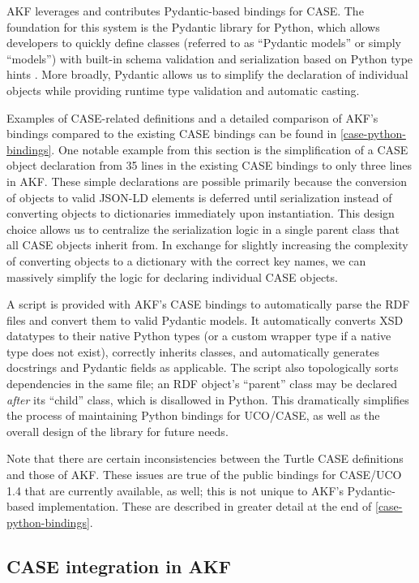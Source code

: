 AKF leverages and contributes Pydantic-based bindings for CASE. The
foundation for this system is the Pydantic library for Python, which
allows developers to quickly define classes (referred to as ``Pydantic
models'' or simply ``models'') with built-in schema validation and
serialization based on Python type hints \cite{colvinPydantic2024}.
More broadly, Pydantic allows us to simplify the declaration of
individual objects while providing runtime type validation and automatic
casting.

Examples of CASE-related definitions and a detailed comparison of AKF's
bindings compared to the existing CASE bindings can be found in
\autoref{case-python-bindings}. One notable example
from this section is the simplification of a CASE object declaration
from 35 lines in the existing CASE bindings to only three lines in AKF.
These simple declarations are possible primarily because the conversion
of objects to valid JSON-LD elements is deferred until serialization
instead of converting objects to dictionaries immediately upon
instantiation. This design choice allows us to centralize the
serialization logic in a single parent class that all CASE objects
inherit from. In exchange for slightly increasing the complexity of
converting objects to a dictionary with the correct key names, we can
massively simplify the logic for declaring individual CASE objects.

A script is provided with AKF's CASE bindings to automatically parse the
RDF files and convert them to valid Pydantic models. It automatically
converts XSD datatypes to their native Python types (or a custom wrapper
type if a native type does not exist), correctly inherits classes, and
automatically generates docstrings and Pydantic fields as applicable.
The script also topologically sorts dependencies in the same file; an
RDF object's ``parent'' class may be declared \emph{after} its ``child''
class, which is disallowed in Python. This dramatically simplifies the
process of maintaining Python bindings for UCO/CASE, as well as the
overall design of the library for future needs.

Note that there are certain inconsistencies between the Turtle CASE
definitions and those of AKF. These issues are true of the public
bindings for CASE/UCO 1.4 that are currently available, as well; this is
not unique to AKF's Pydantic-based implementation. These are described
in greater detail at the end of \autoref{case-python-bindings}.

\subsection{CASE integration in
AKF}\label{case-integration-in-akf}

